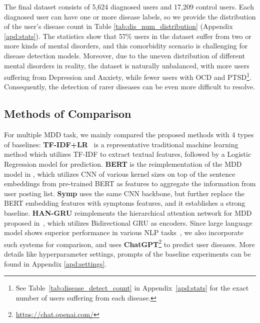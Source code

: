 The final dataset consists of 5,624 diagnosed users and 17,209 control users. 
Each diagnosed user can have one or more disease labels, so we provide the distribution of the user's disease count in Table \ref{tab:dis_num_distribution} (Appendix \ref{apd:stats}). The statistics show that 57\% users in the dataset suffer from two or more kinds of mental disorders, and this comorbidity scenario is challenging for disease detection models. 
Moreover, due to the uneven distribution of different mental disorders in reality, the dataset is naturally unbalanced, with more users suffering from Depression and Anxiety, while fewer users with OCD and PTSD\footnote{See Table~\ref{tab:disease_detect_count} in Appendix~\ref{apd:stats} for the exact number of users suffering from each disease.}. Consequently, the detection of rarer diseases can be even more difficult to resolve.

\subsection{Methods of Comparison}

For multiple MDD task, we mainly compared the proposed methods with 4 types of baselines: \textbf{TF-IDF+LR}~\cite{cohan2018smhd} is a representative traditional machine learning method which utilizes TF-IDF to extract textual features, followed by a Logistic Regression model for prediction. \textbf{BERT} is the reimplementation of the MDD model in \citet{nguyen2022improving}, which utilizes CNN of various kernel sizes on top of the sentence embeddings from pre-trained BERT as features to aggregate the information from user posting list. \textbf{Symp} \cite{Zhang2022SymptomIF} uses the same CNN backbone, but further replace the BERT embedding features with symptoms features, and it establishes a strong baseline. \textbf{HAN-GRU} reimplements the hierarchical attention network for MDD proposed in~\citet{sekulic2019adapting}, which utilizes Bidirectional GRU as encoders. Since large language model shows superior performance in various NLP tasks~\cite{Ye2023ACC}, we also incorporate such systems for comparison, and uses \textbf{ChatGPT}\footnote{\url{https://chat.openai.com/}} to predict user diseases. More details like hyperparameter settings, prompts of the baseline experiments can be found in Appendix \ref{apd:settings}.

